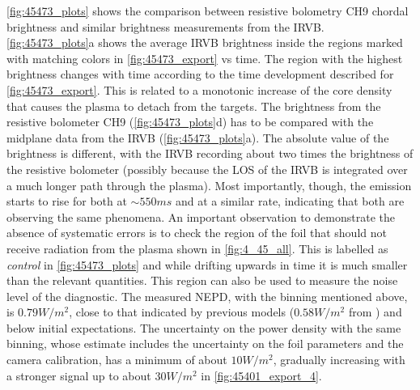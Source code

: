 \autoref{fig:45473_plots} shows the comparison between resistive bolometry CH9 chordal brightness and similar brightness measurements from the IRVB. \autoref{fig:45473_plots}a shows the average IRVB brightness inside the regions marked with matching colors in \autoref{fig:45473_export} vs time. The region with the highest brightness changes with time according to the time development described for \autoref{fig:45473_export}. This is related to a monotonic increase of the core density that causes the plasma to detach from the targets.
The brightness from the resistive bolometer CH9 (\autoref{fig:45473_plots}d) has to be compared with the midplane data from the IRVB (\autoref{fig:45473_plots}a). The absolute value of the brightness is different, with the IRVB recording about two times the brightness of the resistive bolometer (possibly because the LOS of the IRVB is integrated over a much longer path through the plasma). Most importantly, though, the emission starts to rise for both at $\sim550ms$ and at a similar rate, indicating that both are observing the same phenomena. An important observation to demonstrate the absence of systematic errors is to check the region of the foil that should not receive radiation from the plasma shown in \autoref{fig:4_45_all}. This is labelled as \emph{control} in \autoref{fig:45473_plots} and while drifting upwards in time it is much smaller than the relevant quantities. This region can also be used to measure the noise level of the diagnostic. The measured NEPD, with the binning mentioned above, is $0.79 W/m^2$, close to that indicated by previous models ($0.58W/m^2$ from \cite{Pandya2014b}) and below initial expectations. The uncertainty on the power density with the same binning, whose estimate includes the uncertainty on the foil parameters and the camera calibration, has a minimum of about $10 W/m^2$, gradually increasing with a stronger signal up to about $30 W/m^2$ in \autoref{fig:45401_export_4}.

